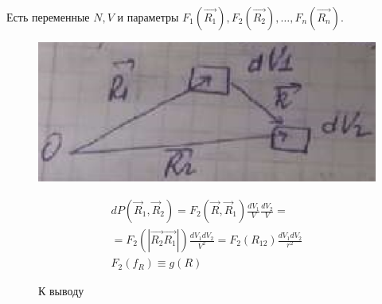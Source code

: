 
\begin{lecture}
	\begin{lecSection}[Введение]
	Есть переменные $ N, V $ и параметры $ F_1 (\vec{R_1}), F_2 (\vec{R_2}), \dots, F_n (\vec{R_n}) $. 
	
	\begin{figure}
	\begin{minipage}{0.48\linewidth}
		\centering\includegraphics[width=\linewidth]{lecture_12/scheme1}
		\label{fig:12:scheme1}
		\caption{К выводу}
	\end{minipage}
	\begin{minipage}{0.48\linewidth}
		\begin{gather*}
			d P \left( \vec { R } _ { 1 } , \vec { R } _ { 2 } \right) =
			F _ { 2 } \left( \vec { R } , \vec { R } _ { 1 } \right) \frac { d V _ { 1 } } { V } \frac{dV_2}{V} = \\
			= F_2 \left( \left| \vec{R_2} \vec{R_1} \right| \right) \frac{dV_1 dV_2}{V^2} = F_2 (R_{12}) \frac{dV_1 dV_2}{r^2} \\
			F_2 ( f_R ) \equiv g (R)
		\end{gather*}
	\end{minipage}
	\end{figure}
	

\end{lecSection}
\end{lecture}
